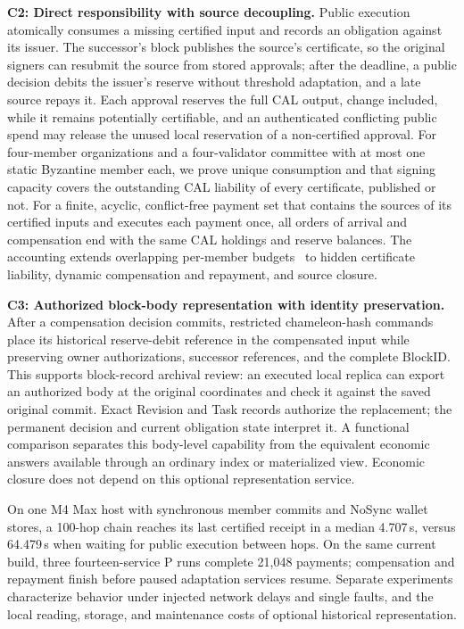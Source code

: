 \noindent\textbf{C2: Direct responsibility with source decoupling.} Public execution atomically consumes a missing certified input and records an obligation against its issuer. The successor's block publishes the source's certificate, so the original signers can resubmit the source from stored approvals; after the deadline, a public decision debits the issuer's reserve without threshold adaptation, and a late source repays it. Each approval reserves the full CAL output, change included, while it remains potentially certifiable, and an authenticated conflicting public spend may release the unused local reservation of a non-certified approval. For four-member organizations and a four-validator committee with at most one static Byzantine member each, we prove unique consumption and that signing capacity covers the outstanding CAL liability of every certificate, published or not. For a finite, acyclic, conflict-free payment set that contains the sources of its certified inputs and executes each payment once, all orders of arrival and compensation end with the same CAL holdings and reserve balances. The accounting extends overlapping per-member budgets~\cite{stingray} to hidden certificate liability, dynamic compensation and repayment, and source closure.

\noindent\textbf{C3: Authorized block-body representation with identity preservation.} After a compensation decision commits, restricted chameleon-hash commands place its historical reserve-debit reference in the compensated input while preserving owner authorizations, successor references, and the complete BlockID. This supports block-record archival review: an executed local replica can export an authorized body at the original coordinates and check it against the saved original commit. Exact Revision and Task records authorize the replacement; the permanent decision and current obligation state interpret it. A functional comparison separates this body-level capability from the equivalent economic answers available through an ordinary index or materialized view. Economic closure does not depend on this optional representation service.

On one M4 Max host with synchronous member commits and NoSync wallet
stores, a 100-hop chain reaches its last certified receipt in a median
4.707\,s, versus 64.479\,s when waiting for public execution between
hops. On the same current build, three fourteen-service P runs complete
21,048 payments; compensation and repayment finish before paused
adaptation services resume. Separate experiments characterize behavior
under injected network delays and single faults, and the local reading,
storage, and maintenance costs of optional historical representation.
